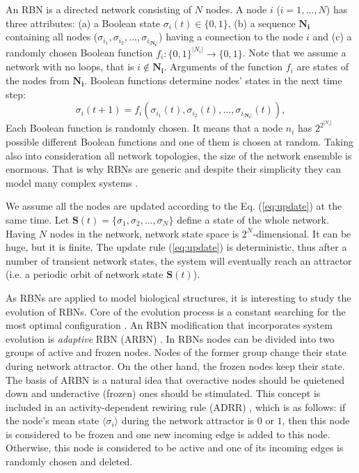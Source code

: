 \documentclass[procedia]{easychair}
\begin{document}
	An RBN is a directed network consisting of ${N}$ nodes. A node $i$ ($i=1, ..., N$) has three attributes: (a) a Boolean state $\sigma_i(t)\in \{0,1\}$, (b) a sequence $\boldsymbol{N_i}$ containing all nodes ($\sigma_{i_1}, \sigma_{i_2}, \ldots, \sigma_{i_{|\boldsymbol{N_i}|}}$) having a connection to the node $i$ and (c) a randomly chosen Boolean function $f_i: \{0,1\}^{|N_i|} \rightarrow \{0,1\}$. 
	Note that we assume a network with no loops, that is  $i \not\in \boldsymbol{N_i}$. 
	Arguments of the function $f_i$ are states of the nodes from $\boldsymbol{N_i}$. Boolean functions determine nodes' states in the next time step:
	\begin{equation}
	\sigma_i(t+1) = f_i(\sigma_{i_1}(t), \sigma_{i_2}(t), \ldots, \sigma_{i_{|\boldsymbol{N_i}|}}(t)),
	\label{eq:update}
	\end{equation}
	Each Boolean function is randomly chosen. It means that a node $n_i$ has $2^{2^{|N_i|}}$ possible different Boolean functions and one of them is chosen at random.
	Taking also into consideration all network topologies, the size of the network ensemble is enormous. That is why RBNs are generic and despite their simplicity they can model many complex systems \cite{drossel2008random}. 
	
	We assume all the nodes are updated according to the Eq. (\ref{eq:update}) at the same time. Let $\boldsymbol{S}(t)=\{\sigma_1, \sigma_2, \ldots, \sigma_N\}$ define a state of the whole network. 
	Having $N$ nodes in the network, network state space is $2^N$-dimensional. It can be huge, but it is finite. The update rule (\ref{eq:update}) is deterministic, thus after a number of transient network states, the system will eventually reach an attractor (i.e. a periodic orbit of network state $\boldsymbol{S}(t)$). 
	
	As RBNs are applied to model biological structures, it is interesting to study the evolution of RBNs. Core of the evolution process is a constant searching for %
	the most optimal configuration \cite{aldana2003boolean,sole1996extinction,zimmermann2004coevolution}. 
	An RBN modification that incorporates system evolution is {\it adaptive} RBN (ARBN) \cite{mlb,soc,haruna14relationship,Gorski2016}. 
	In RBNs nodes can be divided into two groups of active and frozen nodes. Nodes of the former group change their state during network attractor. On the other hand, the frozen nodes keep their state. 
	The basis of ARBN is a natural idea that overactive nodes should be quietened down and underactive (frozen) ones should be stimulated. This concept is included in an activity-dependent rewiring rule (ADRR) \cite{bornholdt2000topological}, which is as follows: 
	if the node’s mean state $\langle\sigma_i\rangle$ during the network attractor is $0$ or $1$, then this node
	is considered to be frozen and one new incoming edge is
	added to this node. Otherwise, this node is considered to be active and one of
	its incoming edges is randomly chosen and deleted.
	
\end{document}
